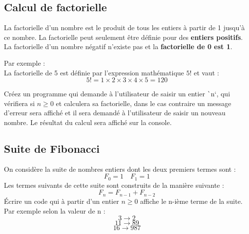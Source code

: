 \documentclass[10pt]{article}
\begin{document}
\subsection{Calcul de factorielle}

La factorielle d'un nombre est le produit de tous les entiers à partir de 1 jusqu'à ce nombre. La factorielle peut seulement être
définie pour des \textbf{entiers positifs}.\\ La factorielle d'un nombre négatif n'existe pas et la \textbf{factorielle de 0 est 1}.

\smallskip
Par exemple :\\
La factorielle de 5 est définie par l'expression mathématique $5!$ et vaut :
$$5!=1 \times 2 \times 3 \times 4 \times 5 = 120$$

\smallskip
Créez un programme qui demande à l'utilisateur de saisir un entier \texttt`n`, qui vérifiera si $n\geq 0$ et calculera sa factorielle, dans le cas contraire un message d'erreur sera affiché et il sera demandé à l'utilisateur de saisir un nouveau nombre. Le résultat du calcul sera affiché sur la console.

\subsection{Suite de Fibonacci}

On considère la suite de nombres entiers dont les deux premiers termes sont :\\
$$F_0=1 \quad F_1=1$$
Les termes suivants de cette suite sont construits de la manière suivante :\\
$$F_n=F_{n-1}+F_{n-2}$$
Écrire un code qui à partir d'un entier $n\geq 0$ affiche le n-ième terme de la suite.\\

\medskip
Par exemple selon la valeur de n :
$$3\rightarrow 2$$
$$11\rightarrow 89$$
$$16\rightarrow 987$$
\end{document}
